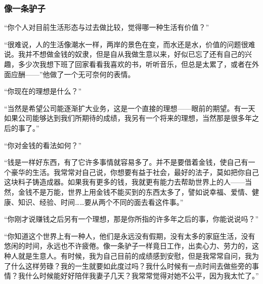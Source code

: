 \subsubsection*{像一条驴子}
\par “你个人对目前生活形态与过去做比较，觉得哪一种生活有价值？”
\par “很难说，人的生活像潮水一样，两岸的景色在变，而水还是水，价值的问题很难说。我并不想做金钱的奴隶，但是自从我做生意以来，好似已忘了还有自己的兴趣，多少次我想下班了回家看看我喜欢的书，听听音乐，但总是太累了，或者在外面应酬——”他做了一个无可奈何的表情。
\par “你现在的理想是什么？”
\par “当然是希望公司能逐渐扩大业务，这是一个直接的理想——眼前的期望。有一天如果公司能够达到我们所期待的成绩，我另有一个将来的理想，当然那是很多年之后的事了。”
\par “你对金钱的看法如何？”
\par “钱是一样好东西，有了它许多事情就容易多了。并不是要借着金钱，使自己有一个豪华的生活。我常常对自己说，你想要有益于社会，最好的法子，莫如把你自己这块料子铸造成器。如果我有更多的钱，我就更有能力去帮助世界上的人——当然，金钱不是万能，世界上用金钱不能买到的东西太多了，譬如说幸福、爱情、健康、知识、经验、时间……要从两个不同的面去看这件事。”
\par “你刚才说赚钱之后另有一个理想，那是你所指的许多年之后的事，你能说说吗？”
\par “你知道这个世界上有一种人，他们是永远没有假期，没有太多的家庭生活，没有悠闲的时间，永远也不许疲倦。像一条驴子一样竟日工作，出卖心力、劳力的，这种人就是生意人。有时候，我为自己目前的成绩感到安慰，但是我常常自问，我为了什么这样劳碌？我的一生就要如此度过吗？我什么时候有一点时间去做些旁的事情？我什么时候能好好陪伴我妻子几天？我常常觉得对她不公平，因为我太忙了。”
